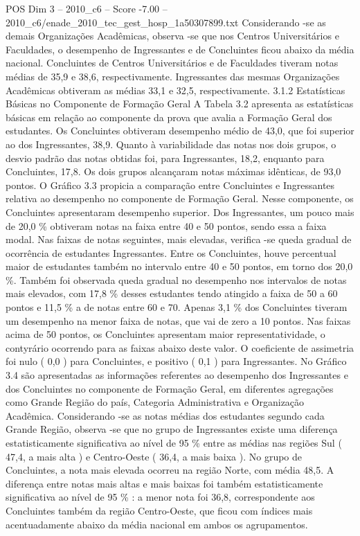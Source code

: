 \begin{textsample}{POS Dim 3 – 2010\_c6 – Score -7.00 – 2010\_c6/enade\_2010\_tec\_gest\_hosp\_1a50307899.txt}
Considerando -se as demais Organizações Acadêmicas, observa -se que nos Centros Universitários e Faculdades, o desempenho de Ingressantes e de Concluintes ficou abaixo da média nacional.
Concluintes de Centros Universitários e de Faculdades tiveram notas médias de 35,9 e 38,6, respectivamente.
Ingressantes das mesmas Organizações Acadêmicas obtiveram as médias 33,1 e 32,5, respectivamente. 3.1.2 Estatísticas Básicas no Componente de Formação Geral A Tabela 3.2 apresenta as estatísticas básicas em relação ao componente da prova que avalia a Formação Geral dos estudantes.
Os Concluintes obtiveram desempenho médio de 43,0, que foi superior ao dos Ingressantes, 38,9.
Quanto à variabilidade das notas nos dois grupos, o desvio padrão das notas obtidas foi, para Ingressantes, 18,2, enquanto para Concluintes, 17,8.
Os dois grupos alcançaram notas máximas idênticas, de 93,0 pontos.
O Gráfico 3.3 propicia a comparação entre Concluintes e Ingressantes relativa ao desempenho no componente de Formação Geral.
Nesse componente, os Concluintes apresentaram desempenho superior.
Dos Ingressantes, um pouco mais de 20,0 \% obtiveram notas na faixa entre 40 e 50 pontos, sendo essa a faixa modal.
Nas faixas de notas seguintes, mais elevadas, verifica -se queda gradual de ocorrência de estudantes Ingressantes.
Entre os Concluintes, houve percentual maior de estudantes também no intervalo entre 40 e 50 pontos, em torno dos 20,0 \%.
Também foi observada queda gradual no desempenho nos intervalos de notas mais elevados, com 17,8 \% desses estudantes tendo atingido a faixa de 50 a 60 pontos e 11,5 \% a de notas entre 60 e 70.
Apenas 3,1 \% dos Concluintes tiveram um desempenho na menor faixa de notas, que vai de zero a 10 pontos.
Nas faixas acima de 50 pontos, os Concluintes apresentam maior representatividade, o contyrário ocorrendo para as faixas abaixo deste valor.
O coeficiente de assimetria foi nulo ( 0,0 ) para Concluintes, e positivo ( 0,1 ) para Ingressantes.
No Gráfico 3.4 são apresentadas as informações referentes ao desempenho dos Ingressantes e dos Concluintes no componente de Formação Geral, em diferentes agregações como Grande Região do país, Categoria Administrativa e Organização Acadêmica.
Considerando -se as notas médias dos estudantes segundo cada Grande Região, observa -se que no grupo de Ingressantes existe uma diferença estatisticamente significativa ao nível de 95 \% entre as médias nas regiões Sul ( 47,4, a mais alta ) e Centro-Oeste ( 36,4, a mais baixa ).
No grupo de Concluintes, a nota mais elevada ocorreu na região Norte, com média 48,5.
A diferença entre notas mais altas e mais baixas foi também estatisticamente significativa ao nível de 95 \% : a menor nota foi 36,8, correspondente aos Concluintes também da região Centro-Oeste, que ficou com índices mais acentuadamente abaixo da média nacional em ambos os agrupamentos.

\end{textsample}

